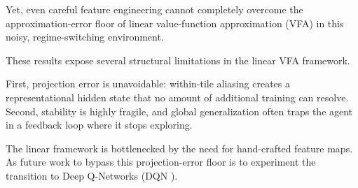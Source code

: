 \documentclass[pdflatex,sn-mathphys-num]{sn-jnl}
\begin{document}
Yet, even careful feature engineering cannot completely overcome the approximation-error floor of linear value-function approximation (VFA) in this noisy, regime-switching environment.

These results expose several structural limitations in the linear VFA framework. 

First, projection error is unavoidable: within-tile aliasing creates a representational 
hidden state that no amount of additional training can resolve. 
Second, stability is highly fragile, and global generalization often traps the agent in a feedback loop where it stops exploring. 

The linear framework is bottlenecked by the need for hand-crafted feature maps. 
As future work to bypass this projection-error floor is to experiment the transition to Deep Q-Networks (DQN \cite{mnih2015human}). 


\end{document}

